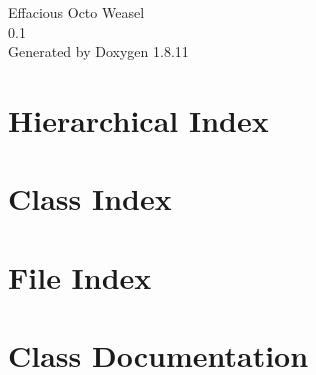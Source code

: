 \documentclass[twoside]{book}
\newcommand{\+}{\discretionary{\mbox{\scriptsize$\hookleftarrow$}}{}{}}
\newcommand{\clearemptydoublepage}{%
  \newpage{\pagestyle{empty}\cleardoublepage}%
}
\begin{document}
\hypersetup{pageanchor=false,
             bookmarksnumbered=true,
             pdfencoding=unicode
            }
\begin{titlepage}
\vspace*{7cm}
\begin{center}%
{\Large Effacious Octo Weasel \\[1ex]\large 0.\+1 }\\
\vspace*{1cm}
{\large Generated by Doxygen 1.8.11}\\
\end{center}
\end{titlepage}
\clearemptydoublepage
\tableofcontents
\clearemptydoublepage
{}
\hypersetup{pageanchor=true}

\chapter{Hierarchical Index}

\chapter{Class Index}

\chapter{File Index}

\chapter{Class Documentation}




















\end{document}

